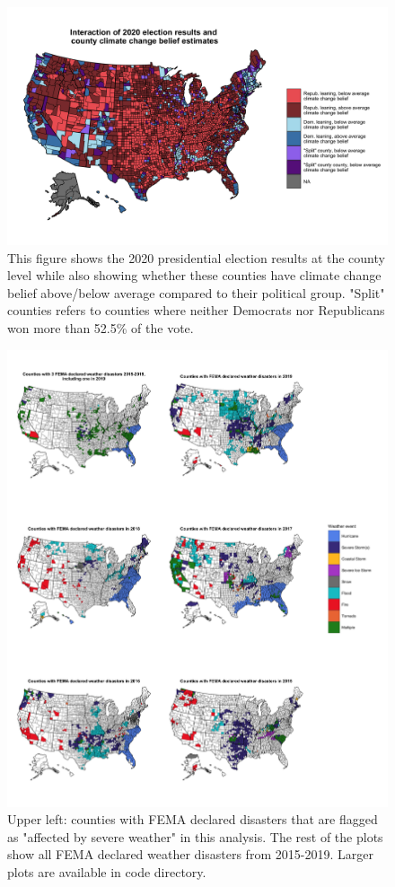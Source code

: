 \documentclass{article}
\begin{document}
\begin{figure}[H]
\centering
\includegraphics[scale=0.225]{images/election_climate_beliefs_map_in_group_comp.png}
\caption{This figure shows the 2020 presidential election results at the county level while also showing whether these counties have climate change belief above/below average compared to their political group. "Split" counties refers to counties where neither Democrats nor Republicans won more than 52.5\% of the vote.}
\end{figure}


\begin{figure}[H]
\centering
\includegraphics[scale=0.175]{images/fema_events_maps_combined.png}
\caption{Upper left: counties with FEMA declared disasters that are flagged as "affected by severe weather" in this analysis. The rest of the plots show all FEMA declared weather disasters from 2015-2019. Larger plots are available in code directory.}
\end{figure}
\end{document}

